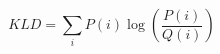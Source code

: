\begin{equation}
    KLD = \sum_{i} P(i) \log \left( \frac{P(i)}{Q(i)} \right)
    \label{eq:kld}
\end{equation}
